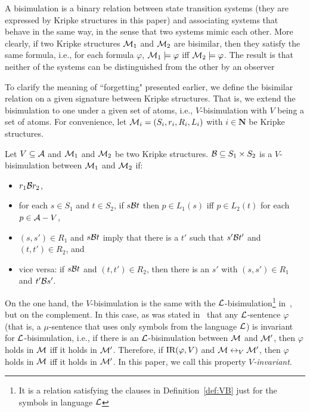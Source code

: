 \documentclass[runningheads]{llncs}
\begin{document}
A bisimulation is a binary relation between state transition systems (they are expressed by Kripke structures in this paper) and associating systems that behave in the same way, in the sense that two systems mimic each other.
More clearly, if two Kripke structures ${\cal M}_1$ and ${\cal M}_2$ are bisimilar, then they satisfy the same formula, i.e., for each formula $\varphi$, ${\cal M}_1 \models \varphi$ iff ${\cal M}_2 \models \varphi$.
The result is that neither of the systems can be distinguished from the other by an observer
 
To clarify the meaning of ``forgetting" presented earlier,
we define the bisimilar relation on a given signature between Kripke structures.
That is, we extend the bisimulation to one under a given set of atoms, i.e., $V$-bisimulation with $V$ being a set of atoms.
For convenience, let ${\cal M}_i=(S_i, r_i, R_i, L_i)$ with $i\in \mathbf{N}$ be Kripke structures.

\begin{definition}[V-bisimulation]\label{def:VB}
	Let $V \subseteq {\cal A}$ and  ${\cal M}_1$ and ${\cal M}_2$ be two Kripke structures. ${\cal B}\subseteq S_1 \times S_2$ is a $V$-bisimulation between ${\cal M}_1$ and ${\cal M}_2$ if:
	\begin{itemize}
		\item $r_1 {\cal B} r_2$,
		\item for each $s\in S_1$ and $t\in S_2$, if $s {\cal B} t$ then $p \in L_1(s)$ iff $p \in L_2(t)$ for each $p \in {\cal A}- V$,
		\item $(s, s')\in R_1$ and $s {\cal B} t$ imply that there is a $t'$ such that $s' {\cal B} t'$ and $(t, t')\in R_2$, and
		\item vice versa: if $s {\cal B} t$ and $(t, t')\in R_2$, then there is an $s'$ with $(s, s')\in R_1$ and $t' {\cal B} s'$.
	\end{itemize}
\end{definition}

On the one hand, the $V$-bisimulation is the same with the ${\cal L}$-bisimulation\footnote{It is a relation satisfying the clauses in Definition~\ref{def:VB} just for the symbols in language ${\cal L}$} in~\cite{d1996uniform}, but on the complement. 
In this case, as was stated in~\cite{d1996uniform} that any ${\cal L}$-sentence $\varphi$ (that is, a $\mu$-sentence
that uses only symbols from the language ${\cal L}$) is invariant for ${\cal L}$-bisimulation,  i.e., if there is an ${\cal L}$-bisimulation between ${\cal M}$ and ${\cal M}'$, then $\varphi$ holds in ${\cal M}$ iff it holds in ${\cal M}'$.
Therefore, if $\textrm{IR}(\varphi, V)$ and
${\cal M} \leftrightarrow_V {\cal M}'$, then $\varphi$ holds in ${\cal M}$ iff it holds in ${\cal M}'$.
In this paper, we call this property \emph{$V$-invariant}.
\end{document}
